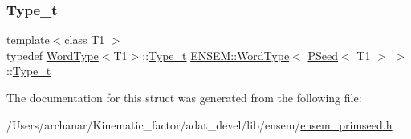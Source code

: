 \mbox{\label{structENSEM_1_1WordType_3_01PSeed_3_01T1_01_4_01_4_a7ec3ab016c8f9b1265ec9fe4ddf9053d}} 
\subsubsection{\texorpdfstring{Type\_t}{Type\_t}\hspace{0.1cm}{\footnotesize\ttfamily [2/2]}}
{\footnotesize\ttfamily template$<$class T1 $>$ \\
typedef \mbox{\hyperlink{structENSEM_1_1WordType}{Word\+Type}}$<$T1$>$\+::\mbox{\hyperlink{structENSEM_1_1WordType_3_01PSeed_3_01T1_01_4_01_4_a7ec3ab016c8f9b1265ec9fe4ddf9053d}{Type\+\_\+t}} \mbox{\hyperlink{structENSEM_1_1WordType}{E\+N\+S\+E\+M\+::\+Word\+Type}}$<$ \mbox{\hyperlink{classENSEM_1_1PSeed}{P\+Seed}}$<$ T1 $>$ $>$\+::\mbox{\hyperlink{structENSEM_1_1WordType_3_01PSeed_3_01T1_01_4_01_4_a7ec3ab016c8f9b1265ec9fe4ddf9053d}{Type\+\_\+t}}}



The documentation for this struct was generated from the following file\+:\begin{DoxyCompactItemize}
\item 
/\+Users/archanar/\+Kinematic\+\_\+factor/adat\+\_\+devel/lib/ensem/\mbox{\hyperlink{lib_2ensem_2ensem__primseed_8h}{ensem\+\_\+primseed.\+h}}\end{DoxyCompactItemize}
